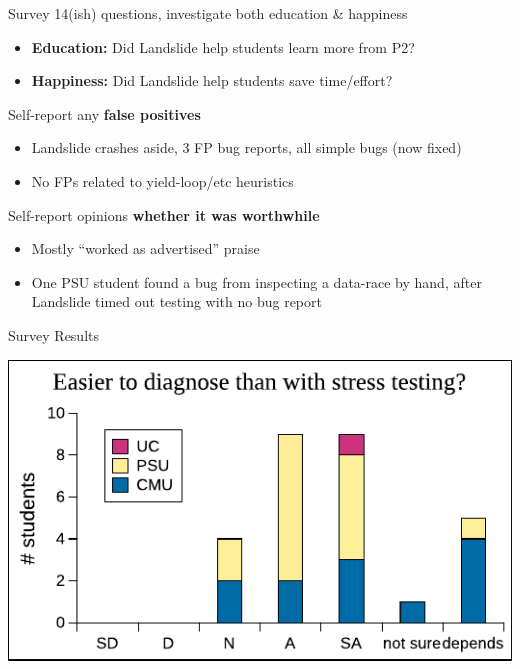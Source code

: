 \documentclass[xcolor=dvipsnames]{beamer}
\begin{document}
\begin{frame}{Survey}
	14(ish) questions, investigate both education \& happiness
	\begin{itemize}
		\item {\bf Education:} Did Landslide help students learn more from P2?
		\item {\bf Happiness:} Did Landslide help students save time/effort?
	\end{itemize}
	\pause
	\linegap

	Self-report any {\bf false positives}
	\begin{itemize}
		\item Landslide crashes aside, 3 FP bug reports, all simple bugs (now fixed)
		\item No FPs related to yield-loop/etc heuristics
	\end{itemize}
	\linegap

	Self-report opinions {\bf whether it was worthwhile}
	\begin{itemize}
		\item Mostly ``worked as advertised'' praise
		\item One PSU student found a bug from inspecting a data-race by hand,
			after Landslide timed out testing with no bug report
	\end{itemize}
\end{frame}

\begin{frame}{Survey Results} %
	\begin{center}
		\includegraphics[width=\textwidth]{../survey6.pdf} %
	\end{center}
\end{frame}
\end{document}
